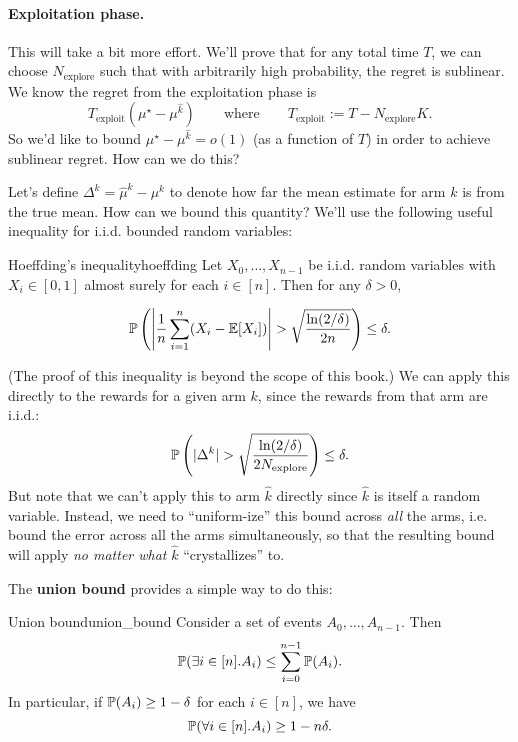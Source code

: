 \documentclass[\main/main]{subfiles}
\newcommand{\Nex}{N_{\text{explore}}}
\begin{document}
\paragraph*{Exploitation phase.} This will take a bit more effort. We'll prove that for any total time $T$, we can choose $\Nex$ such that with arbitrarily high probability, the regret is sublinear. We know the regret from the exploitation phase is
\[
    T_{\text{exploit}} (\mu^\star - \mu^{\hat k}) \qquad \text{where} \qquad T_{\text{exploit}} := T - \Nex K.
\]
So we'd like to bound $\mu^\star - \mu^{\hat k} = o(1)$ (as a function of $T$) in order to achieve sublinear regret. How can we do this?

Let's define $\Delta^k = \hat \mu^k - \mu^k$ to denote how far the mean estimate for arm $k$ is from the true mean. How can we bound this quantity? We'll use the following useful inequality for i.i.d. bounded random variables:

\begin{theorem}{Hoeffding's inequality}{hoeffding}
    Let $X_0, \dots, X_{n-1}$ be i.i.d. random variables with $X_i \in [0, 1]$ almost surely for each $i \in [n]$. Then for any $\delta > 0$,
    
    \begin{equation}
        \P\left( \left| \frac{1}{n} \sum_{i=1}^n (X_i - \E[X_i]) \right| > \sqrt{\frac{\ln(2/\delta)}{2n}} \right) \le \delta.
    \end{equation}
\end{theorem}

(The proof of this inequality is beyond the scope of this book.) We can apply this directly to the rewards for a given arm $k$, since the rewards from that arm are i.i.d.:
\begin{equation}
    \P\left(|\Delta^k | > \sqrt{\frac{\ln(2/\delta)}{2\Nex}} \right) \le \delta. \label{eq:hoeffding-etc}
\end{equation}
But note that we can't apply this to arm $\hat k$ directly since $\hat k$ is itself a random variable. Instead, we need to ``uniform-ize'' this bound across \emph{all} the arms, i.e. bound the error across all the arms simultaneously, so that the resulting bound will apply \emph{no matter what} $\hat k$ ``crystallizes'' to.

The \textbf{union bound} provides a simple way to do this:

\begin{theorem}{Union bound}{union_bound}
    Consider a set of events $A_0, \dots, A_{n-1}$. Then \[
        \P(\exists i \in [n]. A_i) \le \sum_{i=0}^{n-1} \P(A_i).
    \]
    In particular, if $\P(A_i) \ge 1 - \delta$ for each $i \in [n]$, we have \[
        \P(\forall i \in [n]. A_i) \ge 1 - n \delta.
    \]
\end{theorem}
\end{document}
